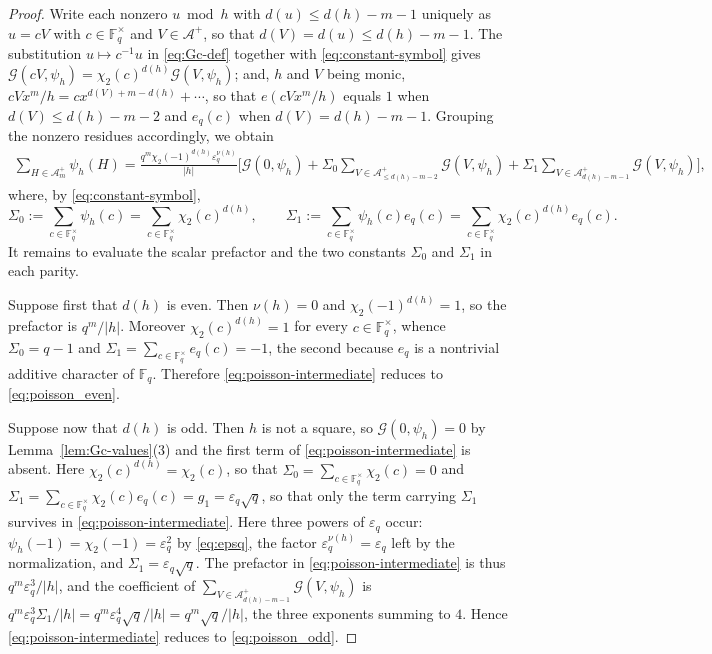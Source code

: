 \documentclass[a4paper,reqno]{amsart}
\numberwithin{equation}{section}
\theoremstyle{remark}
\theoremstyle{definition}
\newcommand{\A}{\mathcal{A}}
\newcommand{\Apn}[1]{\A^+_{#1}}
\newcommand{\Aple}[1]{\A^+_{\le #1}}
\newcommand{\epsq}{\varepsilon_q}
\newcommand{\Gc}{\mathcal{G}}
\begin{document}
\begin{proof}
Write each nonzero $u\bmod h$ with $d(u)\le d(h)-m-1$ uniquely as $u=cV$
with $c\in\mathbb F_q^\times$ and $V\in\A^+$, so that
$d(V)=d(u)\le d(h)-m-1$. The substitution $u\mapsto c^{-1}u$ in \eqref{eq:Gc-def} together with
\eqref{eq:constant-symbol} gives
$\Gc(cV,\psi_h)=\chi_2(c)^{d(h)}\Gc(V,\psi_h)$; and, $h$ and $V$ being monic,
$cVx^m/h=cx^{d(V)+m-d(h)}+\cdots$, so that $e(cVx^m/h)$ equals $1$ when
$d(V)\le d(h)-m-2$ and $e_q(c)$ when $d(V)=d(h)-m-1$. Grouping the
nonzero residues accordingly, we obtain
\begin{align}\label{eq:poisson-intermediate}
\sum_{H\in\Apn{m}}\psi_h(H)
=
\frac{q^m\chi_2(-1)^{d(h)}\epsq^{\nu(h)}}{|h|}
\Biggl[
\Gc(0,\psi_h)
+\Sigma_0
\sum_{V\in\Aple{d(h)-m-2}}\Gc(V,\psi_h)
+\Sigma_1
\sum_{V\in\Apn{d(h)-m-1}}\Gc(V,\psi_h)
\Biggr],
\end{align}
where, by \eqref{eq:constant-symbol},
$$
\Sigma_0:=\sum_{c\in\mathbb F_q^\times}\psi_h(c)
=\sum_{c\in\mathbb F_q^\times}\chi_2(c)^{d(h)},
\qquad
\Sigma_1:=\sum_{c\in\mathbb F_q^\times}\psi_h(c)e_q(c)
=\sum_{c\in\mathbb F_q^\times}\chi_2(c)^{d(h)}e_q(c).
$$
It remains to evaluate the scalar prefactor and the two constants $\Sigma_0$
and $\Sigma_1$ in each parity.

Suppose first that $d(h)$ is even. Then $\nu(h)=0$ and
$\chi_2(-1)^{d(h)}=1$, so the prefactor is $q^m/|h|$. Moreover
$\chi_2(c)^{d(h)}=1$ for every $c\in\mathbb F_q^\times$, whence
$\Sigma_0=q-1$ and $\Sigma_1=\sum_{c\in\mathbb F_q^\times}e_q(c)=-1$,
the second because $e_q$ is a nontrivial additive character of
$\mathbb F_q$. Therefore \eqref{eq:poisson-intermediate} reduces to
\eqref{eq:poisson_even}.

Suppose now that $d(h)$ is odd. Then $h$ is not a square, so
$\Gc(0,\psi_h)=0$ by Lemma~\ref{lem:Gc-values}(3) and the first term of
\eqref{eq:poisson-intermediate} is absent. Here $\chi_2(c)^{d(h)}=\chi_2(c)$,
so that $\Sigma_0=\sum_{c\in\mathbb F_q^\times}\chi_2(c)=0$ and
$\Sigma_1=\sum_{c\in\mathbb F_q^\times}\chi_2(c)e_q(c)=g_1=\epsq\sqrt q$,
so that only the term carrying $\Sigma_1$ survives in
\eqref{eq:poisson-intermediate}. Here three powers of $\epsq$ occur: $\psi_h(-1)=\chi_2(-1)=\epsq^2$ by
\eqref{eq:epsq}, the factor $\epsq^{\nu(h)}=\epsq$ left by the
normalization, and $\Sigma_1=\epsq\sqrt q$. The prefactor in
\eqref{eq:poisson-intermediate} is thus $q^m\epsq^3/|h|$, and the
coefficient of $\sum_{V\in\Apn{d(h)-m-1}}\Gc(V,\psi_h)$ is
$q^m\epsq^{3}\Sigma_1/|h|=q^m\epsq^{4}\sqrt q/|h|=q^m\sqrt q/|h|$, the three
exponents summing to $4$. Hence
\eqref{eq:poisson-intermediate} reduces to \eqref{eq:poisson_odd}.
\end{proof}
\end{document}
